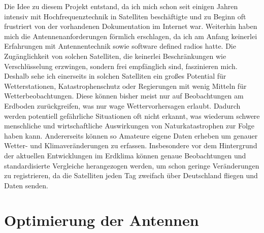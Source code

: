 \begin{multicols}{2}
    Die Idee zu diesem Projekt entstand, da ich mich schon seit einigen Jahren intensiv mit Hochfrequenztechnik in Satelliten beschäftigte und zu Beginn oft frustriert von der vorhandenen Dokumentation im Internet war. Weiterhin haben mich die Antennenanforderungen förmlich erschlagen, da ich am Anfang keinerlei Erfahrungen mit Antennentechnik sowie \glqq software defined radios \grqq hatte. Die Zugänglichkeit von solchen Satelliten, die keinerlei Beschränkungen wie Verschlüsselung erzwingen, sondern frei empfänglich sind, faszinieren mich. 
    Deshalb sehe ich einerseits in solchen Satelliten ein großes Potential für Wetterstationen, Katastrophenschutz oder Regierungen mit wenig Mitteln für Wetterbeobachtungen. Diese können bisher meist nur auf Beobachtungen am Erdboden zurückgreifen, was nur wage Wettervorhersagen erlaubt. Dadurch werden potentiell gefährliche Situationen oft nicht erkannt, was wiederum schwere menschliche und wirtschaftliche Auswirkungen von Naturkatastrophen zur Folge haben kann. 
    Andererseits können so Amateure eigene Daten erheben um genauer Wetter- und Klimaveränderungen zu erfassen. 
    Insbesondere vor dem Hintergrund der aktuellen Entwicklungen im Erdklima können genaue Beobachtungen und standardisierte Vergleiche herangezogen werden, um schon geringe Veränderungen zu registrieren, da die Satelliten jeden Tag zweifach über Deutschland fliegen und Daten senden.
    

\end{multicols}

\section[]{Optimierung der Antennen}

